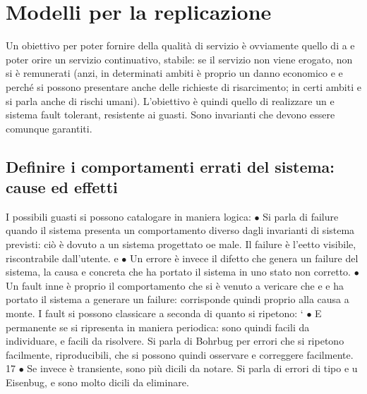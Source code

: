 \section{Modelli per la replicazione}
Un obiettivo per poter fornire della qualità di servizio è ovviamente quello di
a
e
poter orire un servizio continuativo, stabile: se il servizio non viene erogato,
non si è remunerati (anzi, in determinati ambiti è proprio un danno economico
e
e
perché si possono presentare anche delle richieste di risarcimento; in certi ambiti
e
si parla anche di rischi umani). L'obiettivo è quindi quello di realizzare un
e
sistema fault tolerant, resistente ai guasti. Sono invarianti che devono essere
comunque garantiti.
\subsection{Definire i comportamenti errati del sistema: cause ed effetti}
I possibili guasti si possono catalogare in maniera logica:
$\bullet$ Si parla di failure quando il sistema presenta un comportamento diverso
dagli invarianti di sistema previsti: ciò è dovuto a un sistema progettato
oe
male. Il failure è l'eetto visibile, riscontrabile dall'utente.
e
$\bullet$ Un errore è invece il difetto che genera un failure del sistema, la causa
e
concreta che ha portato il sistema in uno stato non corretto.
$\bullet$ Un fault inne è proprio il comportamento che si è venuto a vericare che
e
e
ha portato il sistema a generare un failure: corrisponde quindi proprio alla
causa a monte.
I fault si possono classicare a seconda di quanto si ripetono:
`
$\bullet$ E permanente se si ripresenta in maniera periodica: sono quindi facili
da individuare, e facili da risolvere. Si parla di Bohrbug per errori che
si ripetono facilmente, riproducibili, che si possono quindi osservare e
correggere facilmente.
17
$\bullet$ Se invece è transiente, sono più dicili da notare. Si parla di errori di tipo
e
u
Eisenbug, e sono molto dicili da eliminare.
